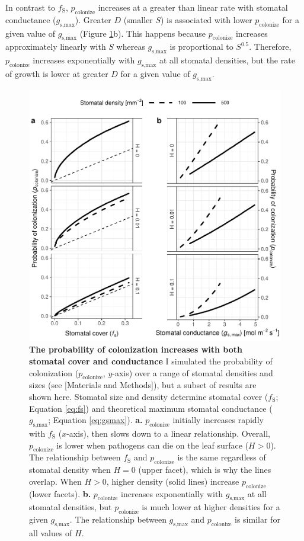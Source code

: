 \documentclass[utf8]{frontiersSCNS}
\newcommand{\fs}{$f_\text{S}$}
\newcommand{\gsmax}{$g_\text{s,max}$}
\begin{document}
In contrast to \fs, \(p_\text{colonize}\) increases at a greater than
linear rate with stomatal conductance (\gsmax). Greater \(D\) (smaller
\(S\)) is associated with lower \(p_\text{colonize}\) for a given value
of \gsmax{} (Figure \ref{fig:fig3}b). This happens because
\(p_\text{colonize}\) increases approximately linearly with \(S\)
whereas \gsmax{} is proportional to \(S^{0.5}\). Therefore,
\(p_\text{colonize}\) increases exponentially with \gsmax{} at all
stomatal densities, but the rate of growth is lower at greater \(D\) for
a given value of \gsmax.

\begin{figure}
  \centering
    \includegraphics{../figures/fig3.pdf}
    \caption{\textbf{The probability of colonization increases with both stomatal cover and conductance} I simulated the probability of colonization ($p_\text{colonize}$, $y$-axis) over a range of stomatal densities and sizes (see [Materials and Methods]), but a subset of results are shown here. Stomatal size and density determine stomatal cover (\fs; Equation \ref{eq:fs}) and theoretical maximum stomatal conductance (\gsmax; Equation \ref{eq:gsmax}). \textbf{a.} $p_\text{colonize}$ initially increases rapidly with \fs{} ($x$-axis), then slows down to a linear relationship. Overall, $p_\text{colonize}$ is lower when pathogens can die on the leaf surface ($H > 0$). The relationship between \fs{} and $p_\text{colonize}$ is the same regardless of stomatal density when $H = 0$ (upper facet), which is why the lines overlap. When $H > 0$, higher density (solid lines) increase $p_\text{colonize}$ (lower facets). \textbf{b.} $p_\text{colonize}$ increases exponentially with \gsmax{} at all stomatal densities, but $p_\text{colonize}$ is much lower at higher densities for a given \gsmax. The relationship between \gsmax{} and $p_\text{colonize}$ is similar for all values of $H$.}
    \label{fig:fig3}
\end{figure}
\end{document}
